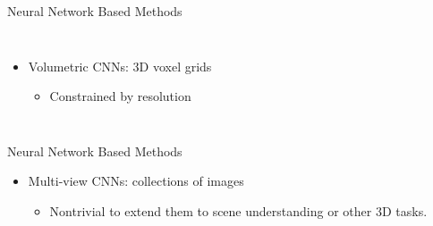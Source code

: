 \documentclass[serif,mathserif]{beamer}
\begin{document}
\begin{frame}{Neural Network Based Methods}
	\begin{columns}
		\begin{itemize}
			\item Volumetric CNNs: 3D voxel grids
			\begin{itemize}
				\item Constrained by resolution
			\end{itemize}
		\end{itemize}
		
	\begin{figure}
		\centering
	\end{figure}
	
	\end{columns}
	
\end{frame}

\begin{frame}{Neural Network Based Methods}
	\begin{itemize}
		\item Multi-view CNNs: collections of images
		\begin{itemize}
			\item Nontrivial to extend them to scene understanding or other 3D tasks.
		\end{itemize}
	\end{itemize}
	\begin{figure}
		\centering
	\end{figure}
	
\end{frame}
\end{document}
